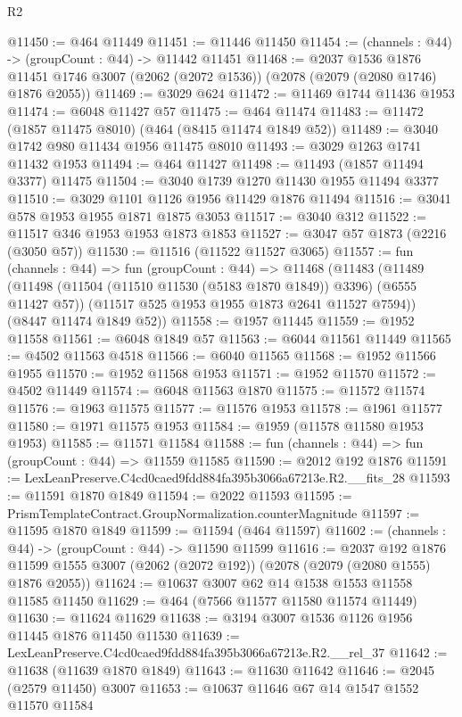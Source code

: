 \begin{lexlean}{R2}
\begin{coremodule}
@11450 := @464 @11449
@11451 := @11446 @11450
@11454 := (channels : @44) -> (groupCount : @44) -> @11442 @11451
@11468 := @2037
    @1536
    @1876
    @11451
    @1746
    @3007
    (@2062 (@2072 @1536))
    (@2078 (@2079 (@2080 @1746) @1876 @2055))
@11469 := @3029 @624
@11472 := @11469 @1744 @11436 @1953
@11474 := @6048 @11427 @57
@11475 := @464 @11474
@11483 := @11472 (@1857 @11475 @8010) (@464 (@8415 @11474 @1849 @52))
@11489 := @3040 @1742 @980 @11434 @1956 @11475 @8010
@11493 := @3029 @1263 @1741 @11432 @1953
@11494 := @464 @11427
@11498 := @11493 (@1857 @11494 @3377) @11475
@11504 := @3040 @1739 @1270 @11430 @1955 @11494 @3377
@11510 := @3029 @1101 @1126 @1956 @11429 @1876 @11494
@11516 := @3041 @578 @1953 @1955 @1871 @1875 @3053
@11517 := @3040 @312
@11522 := @11517 @346 @1953 @1953 @1873 @1853
@11527 := @3047 @57 @1873 (@2216 (@3050 @57))
@11530 := @11516 (@11522 @11527 @3065)
@11557 := fun (channels : @44) =>
  fun (groupCount : @44) =>
  @11468
    (@11483
      (@11489
        (@11498 (@11504 (@11510 @11530 (@5183 @1870 @1849)) @3396) (@6555 @11427 @57))
        (@11517 @525 @1953 @1955 @1873 @2641 @11527 @7594))
      (@8447 @11474 @1849 @52))
@11558 := @1957 @11445
@11559 := @1952 @11558
@11561 := @6048 @1849 @57
@11563 := @6044 @11561 @11449
@11565 := @4502 @11563 @4518
@11566 := @6040 @11565
@11568 := @1952 @11566 @1955
@11570 := @1952 @11568 @1953
@11571 := @1952 @11570
@11572 := @4502 @11449
@11574 := @6048 @11563 @1870
@11575 := @11572 @11574
@11576 := @1963 @11575
@11577 := @11576 @1953
@11578 := @1961 @11577
@11580 := @1971 @11575 @1953
@11584 := @1959 (@11578 @11580 @1953 @1953)
@11585 := @11571 @11584
@11588 := fun (channels : @44) => fun (groupCount : @44) => @11559 @11585
@11590 := @2012 @192 @1876
@11591 := LexLeanPreserve.C4cd0caed9fdd884fa395b3066a67213e.R2.__fits_28
@11593 := @11591 @1870 @1849
@11594 := @2022 @11593
@11595 := PrismTemplateContract.GroupNormalization.counterMagnitude
@11597 := @11595 @1870 @1849
@11599 := @11594 (@464 @11597)
@11602 := (channels : @44) -> (groupCount : @44) -> @11590 @11599
@11616 := @2037
    @192
    @1876
    @11599
    @1555
    @3007
    (@2062 (@2072 @192))
    (@2078 (@2079 (@2080 @1555) @1876 @2055))
@11624 := @10637 @3007 @62 @14 @1538 @1553 @11558 @11585 @11450
@11629 := @464 (@7566 @11577 @11580 @11574 @11449)
@11630 := @11624 @11629
@11638 := @3194 @3007 @1536 @1126 @1956 @11445 @1876 @11450 @11530
@11639 := LexLeanPreserve.C4cd0caed9fdd884fa395b3066a67213e.R2.__rel_37
@11642 := @11638 (@11639 @1870 @1849)
@11643 := @11630 @11642
@11646 := @2045 (@2579 @11450) @3007
@11653 := @10637 @11646 @67 @14 @1547 @1552 @11570 @11584

\end{coremodule}
\end{lexlean}
